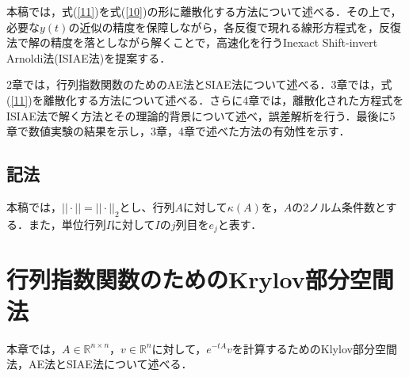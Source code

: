 \documentclass[a4paper,12pt]{nodlabpabw}
\begin{document}
本稿では，式(\ref{11})を式(\ref{10})の形に離散化する方法について述べる．その上で，必要な$y(t)$の近似の精度を保障しながら，各反復で現れる線形方程式を，反復法で解の精度を落としながら解くことで，高速化を行うInexact Shift-invert Arnoldi法(ISIAE法)を提案する．

2章では，行列指数関数のためのAE法とSIAE法について述べる．3章では，式(\ref{11})を離散化する方法について述べる．さらに4章では，離散化された方程式をISIAE法で解く方法とその理論的背景について述べ，誤差解析を行う．最後に5章で数値実験の結果を示し，3章，4章で述べた方法の有効性を示す．
\section{記法}
本稿では，$||\cdot||=||\cdot||_2$とし、行列$A$に対して$\kappa(A)$を，$A$の2ノルム条件数とする．また，単位行列$I$に対して$I$の$j$列目を$e_j$と表す．
%
\chapter{行列指数関数のためのKrylov部分空間法}\label{chapKry}
本章では，$A\in\mathbb{R}^{n\times n}$，$v\in\mathbb{R}^n$に対して，$e^{-tA}v$を計算するためのKlylov部分空間法，AE法とSIAE法について述べる．
\end{document}
